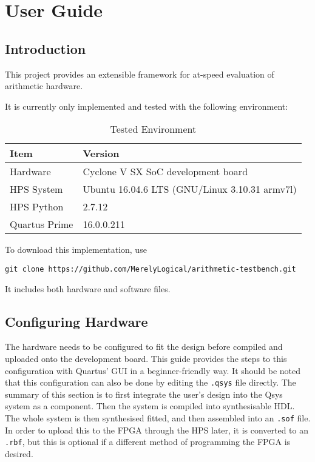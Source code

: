 \chapter{User Guide}

\section{Introduction}

This project provides an extensible framework for at-speed evaluation of arithmetic hardware.

It is currently only implemented and tested with the following environment:
\begin{table}[H]
  \centering
  \begin{tabular}{|l|l|}
    \hline
    Item          & Version \\
    \hline
    Hardware      & Cyclone V SX SoC development board \\
    HPS System    & Ubuntu 16.04.6 LTS (GNU/Linux 3.10.31 armv7l)\\
    HPS Python    & 2.7.12 \\
    Quartus Prime & 16.0.0.211 \\
    \hline
  \end{tabular}
  \caption{Tested Environment}
\end{table}

To download this implementation, use

\texttt{git clone https://github.com/MerelyLogical/arithmetic-testbench.git}

It includes both hardware and software files.

\section{Configuring Hardware}
The hardware needs to be configured to fit the design before compiled and uploaded onto the development board.
This guide provides the steps to this configuration with Quartus' GUI in a beginner-friendly way.
It should be noted that this configuration can also be done by editing the \texttt{.qsys} file directly.
The summary of this section is to first integrate the user's design into the Qsys system as a component.
Then the system is compiled into synthesisable HDL.
The whole system is then synthesised fitted, and then assembled into an \texttt{.sof} file.
In order to upload this to the FPGA through the HPS later, it is converted to an \texttt{.rbf}, but this is optional if a different method of programming the FPGA is desired.

